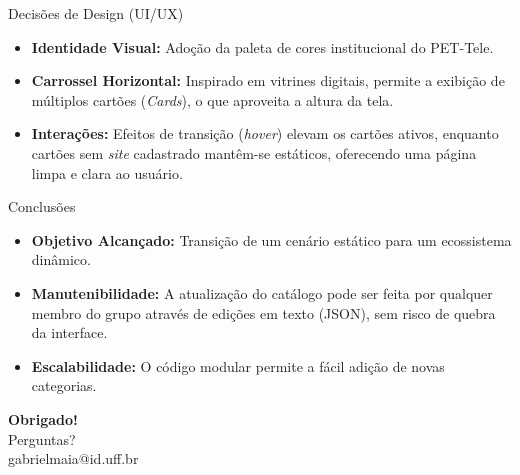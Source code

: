 \documentclass[10pt, aspectratio=169]{beamer}
\begin{document}
\begin{frame}{Decisões de Design (UI/UX)}
    \begin{itemize}
        \item \textbf{Identidade Visual:} Adoção da paleta de cores institucional do PET-Tele.
        \item \textbf{Carrossel Horizontal:} Inspirado em vitrines digitais, permite a exibição de múltiplos cartões (\textit{Cards}), o que aproveita a altura da tela.
        \item \textbf{Interações:} Efeitos de transição (\textit{hover}) elevam os cartões ativos, enquanto cartões sem \textit{site} cadastrado mantêm-se estáticos, oferecendo uma página limpa e clara ao usuário.
    \end{itemize}
\end{frame}

\begin{frame}{Conclusões}
    \begin{itemize}
        \item \textbf{Objetivo Alcançado:} Transição de um cenário estático para um ecossistema dinâmico.
        \item \textbf{Manutenibilidade:} A atualização do catálogo pode ser feita por qualquer membro do grupo através de edições em texto (JSON), sem risco de quebra da interface.
        \item \textbf{Escalabilidade:} O código modular permite a fácil adição de novas categorias.
    \end{itemize}
\end{frame}

\begin{frame}
    \centering
    \Large \textbf{Obrigado!} \\
    \vspace{1cm}
    \normalsize Perguntas? \\
    \vspace{1cm}
    \small gabrielmaia@id.uff.br
\end{frame}
\end{document}
